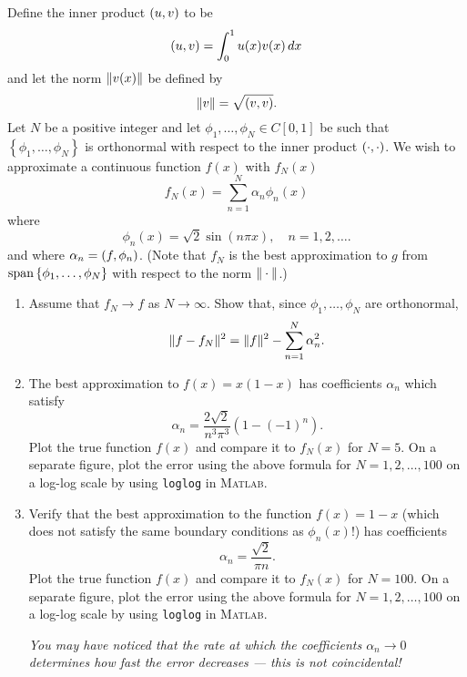 Define the inner product $(u,v)$ to be
\[
(u,v)=\int_0^1u(x)v(x)\,dx
\]
and let the norm $\|v(x)\|$ be defined by
\[
\|v\|=\sqrt{(v,v)}.
\]
Let $N$ be a positive integer and let $\phi_1,\ldots,\phi_N\in C[0,1]$ be such that $\left\{\phi_1,\ldots,\phi_N\right\}$ is orthonormal with respect to the inner product $(\cdot,\cdot)$. We wish to approximate a continuous function $f(x)$ with $f_N(x)$
\[
f_N(x)=\sum_{n=1}^N\alpha_n\phi_n(x)
\]
where
\[
\phi_n(x) = \sqrt{2} \sin(n \pi x),\quad n=1,2,\ldots.
\]
and where $\alpha_n=(f,\phi_n)$. (Note that $f_N$ is the best approximation to $g$ from ${\rm span}\left\{\phi_1,\ldots,\phi_N\right\}$ with respect to the norm $\|\cdot\|$.)

\begin{enumerate}
\item Assume that $f_N \rightarrow f$ as $N\rightarrow \infty$.  Show that, since $\phi_1,\ldots,\phi_N$ are orthonormal, 
\[
\|f-f_N\|^2  = \|f\|^2 - \sum_{n=1}^N \alpha_n^2.
\]
\item The best approximation to $f(x) = x(1-x)$ has coefficients $\alpha_n$ which satisfy
\[
\alpha_n = \frac{2\sqrt{2}}{n^3\pi^3}(1-(-1)^n).
\]
Plot the true function $f(x)$ and compare it to $f_N(x)$ for $N = 5$.  On a separate figure, plot the error using the above formula for $N = 1,2,\ldots,100$ on a log-log scale by using \verb|loglog| in \textsc{Matlab}.  
\item Verify that the best approximation to the function $f(x) = 1-x$ (which does not satisfy the same boundary conditions as $\phi_n(x)$!) has coefficients
\[
\alpha_n =  \frac{\sqrt{2}}{\pi n}.
\]
Plot the true function $f(x)$ and compare it to $f_N(x)$ for $N = 100$.  On a separate figure, plot the error using the above formula for $N = 1,2,\ldots,100$ on a log-log scale by using \verb|loglog| in \textsc{Matlab}.  

\vspace{2em}
\emph{You may have noticed that the rate at which the coefficients $\alpha_n \rightarrow 0$ determines how fast the error decreases --- this is not coincidental!}  %


\end{enumerate}


